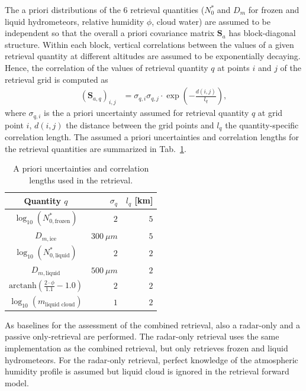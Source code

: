 \documentclass[journal abbreviation, manuscript]{copernicus}
\begin{document}
The a priori distributions of the 6 retrieval quantities ($N_0^*$ and $D_m$ for
frozen and liquid hydrometeors, relative humidity $\phi$, cloud water) are
assumed to be independent so that the overall a priori covariance matrix
$\mathbf{S}_a$ has block-diagonal structure. Within each block, vertical
correlations between the values of a given retrieval quantity at different
altitudes are assumed to be exponentially decaying. Hence, the correlation of
the values of retrieval quantity $q$ at points $i$ and $j$ of the retrieval grid
is computed as
%
\begin{align}
\left ( \mathbf{S}_{a,q} \right )_{i, j} &= \sigma_{q,i} \sigma_{q,j}
 \cdot \exp  \left ( -\frac{d(i, j)}{l_q} \right ),
\end{align}
%
where $\sigma_{q, i}$ is the a priori uncertainty assumed for retrieval
quantity $q$ at grid point $i$, $d(i, j)$ the distance between the grid
points and $l_q$ the quantity-specific correlation length. The assumed
a priori uncertainties and correlation lengths for the retrieval quantities
are summarized in Tab.~\ref{tab:a_priori}.

\begin{table}[h!]
\caption{A priori uncertainties and correlation
 lengths used in the retrieval.}
 \centering
\label{tab:a_priori}
    \begin{tabular}{c|r|r}
     Quantity $q$ & $\sigma_q$ & $l_q$ [km]\\
    \hline
    $\log_{10}(N_{0, \text{frozen}}^*)$    & $2$                       & $5$ \\
    $D_{m, \text{ice}}$               & $300\ \unit{\mu m}$          & $5$ \\
    $\log_{10}(N_{0, \text{liquid}}^*)$    & $2                      $ & $2$ \\
    $D_{m, \text{liquid}}$            & $500\ \unit{\mu m}$           & $2$ \\
    $\text{arctanh}(\frac{2 \cdot \phi}{1.1} - 1.0)$ & $2$       & $2$ \\
    $\log_{10}(m_\text{liquid cloud}) $ & $1$                       & $2$ \\
    \end{tabular}
\end{table}

As baselines for the assessment of the combined retrieval, also a radar-only and
a passive only-retrieval are performed. The radar-only retrieval uses the same
implementation as the combined retrieval, but only retrieves frozen and liquid
hydrometeors. For the radar-only retrieval, perfect knowledge of the atmospheric
humidity profile is assumed but liquid cloud is ignored in the retrieval forward
model.
\end{document}
